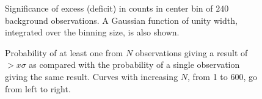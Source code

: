 \begin{figure}[p]
\centerline{}
\caption{\label{FIG::ANALYSIS::SIGMACENTER} Significance of 
excess (deficit) in counts in center bin of $240$ background observations. 
A Gaussian function of unity width, integrated over the binning size, 
is also shown.}
\end{figure}

\begin{figure}[p]
\centerline{}
\caption{\label{FIG::ANALYSIS::SIGMASIGMA} Probability of at 
least one from $N$ observations giving a result of $>x\sigma$ as 
compared with the probability of a single observation giving the same
result. Curves with increasing $N$, from 1 to 600, go from left to
right.}
\end{figure}

